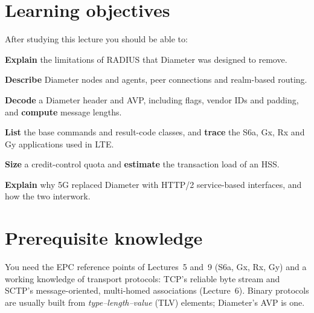 \documentclass[11pt,a4paper]{article}
\begin{document}
\ACNcover

\section{Learning objectives}
After studying this lecture you should be able to:
\begin{objectives}
  \item \textbf{Explain} the limitations of RADIUS that Diameter was designed to remove.
  \item \textbf{Describe} Diameter nodes and agents, peer connections and realm-based routing.
  \item \textbf{Decode} a Diameter header and AVP, including flags, vendor IDs and padding, and
        \textbf{compute} message lengths.
  \item \textbf{List} the base commands and result-code classes, and \textbf{trace} the S6a, Gx,
        Rx and Gy applications used in LTE.
  \item \textbf{Size} a credit-control quota and \textbf{estimate} the transaction load of an HSS.
  \item \textbf{Explain} why 5G replaced Diameter with HTTP/2 service-based interfaces, and how the two
        interwork.
\end{objectives}

\section{Prerequisite knowledge}
You need the EPC reference points of Lectures~5 and~9 (S6a, Gx, Rx, Gy) and a working knowledge of
transport protocols: TCP's reliable byte stream and SCTP's message-oriented, multi-homed associations
(Lecture~6). Binary protocols are usually built from \emph{type--length--value} (TLV) elements; Diameter's
AVP is one.
\end{document}

